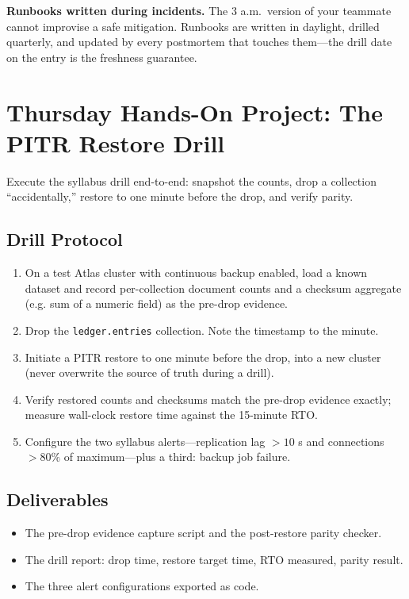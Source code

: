 \begin{pitfall}
\textbf{Runbooks written during incidents.} The 3 a.m.\ version of your teammate cannot improvise a safe mitigation. Runbooks are written in daylight, drilled quarterly, and updated by every postmortem that touches them---the drill date on the entry is the freshness guarantee.
\end{pitfall}
\section{Thursday Hands-On Project: The PITR Restore Drill}
Execute the syllabus drill end-to-end: snapshot the counts, drop a collection ``accidentally,'' restore to one minute before the drop, and verify parity.

\subsection{Drill Protocol}
\begin{enumerate}
    \item On a test Atlas cluster with continuous backup enabled, load a known dataset and record per-collection document counts and a checksum aggregate (e.g. sum of a numeric field) as the pre-drop evidence.
    \item Drop the \texttt{ledger.entries} collection. Note the timestamp to the minute.
    \item Initiate a PITR restore to one minute before the drop, into a new cluster (never overwrite the source of truth during a drill).
    \item Verify restored counts and checksums match the pre-drop evidence exactly; measure wall-clock restore time against the 15-minute RTO.
    \item Configure the two syllabus alerts---replication lag $>10$ s and connections $>80\%$ of maximum---plus a third: backup job failure.
\end{enumerate}

\subsection*{Deliverables}
\begin{itemize}
    \item The pre-drop evidence capture script and the post-restore parity checker.
    \item The drill report: drop time, restore target time, RTO measured, parity result.
    \item The three alert configurations exported as code.
\end{itemize}

